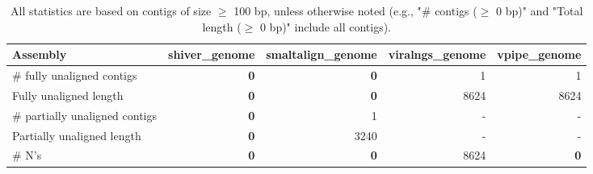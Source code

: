 \documentclass[12pt,a4paper]{article}
\begin{document}
\begin{table}[ht]
\begin{center}
\caption{All statistics are based on contigs of size $\geq$ 100 bp, unless otherwise noted (e.g., "\# contigs ($\geq$ 0 bp)" and "Total length ($\geq$ 0 bp)" include all contigs).}
\begin{tabular}{|l*{4}{|r}|}
\hline
Assembly & shiver\_genome & smaltalign\_genome & viralngs\_genome & vpipe\_genome \\ \hline
\# fully unaligned contigs & {\bf 0} & {\bf 0} & 1 & 1 \\ \hline
Fully unaligned length & {\bf 0} & {\bf 0} & 8624 & 8624 \\ \hline
\# partially unaligned contigs & {\bf 0} & 1 & - & - \\ \hline
Partially unaligned length & {\bf 0} & 3240 & - & - \\ \hline
\# N's & {\bf 0} & {\bf 0} & 8624 & {\bf 0} \\ \hline
\end{tabular}
\end{center}
\end{table}
\end{document}
